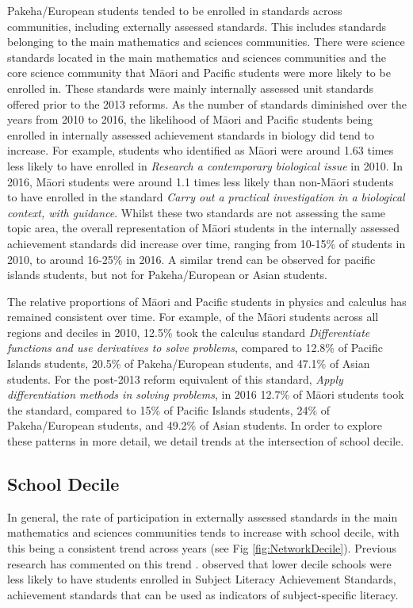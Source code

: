 \documentclass[a4paper]{article}
\begin{document}
\begin{figure}
    \label{fig:NetworkEthnicity}
\end{figure}

Pakeha/European students tended to be enrolled in standards across communities, including externally assessed standards. This includes standards belonging to the main mathematics and sciences communities. There were science standards located in the main mathematics and sciences communities and the core science community that M\={a}ori and Pacific students were more likely to be enrolled in. These standards were mainly internally assessed unit standards  offered prior to the 2013 reforms. As the number of standards diminished over the years from 2010 to 2016, the likelihood of M\={a}ori and Pacific students being enrolled in internally assessed achievement standards in biology did tend to increase. For example, students who identified as M\={a}ori were around 1.63 times less likely to have enrolled in \textit{Research a contemporary biological issue} in 2010. In 2016, M\={a}ori students were around 1.1 times less likely than non-M\={a}ori students to have enrolled in the standard \textit{Carry out a practical investigation in a biological context, with guidance}. Whilst these two standards are not assessing the same topic area, the overall representation of M\={a}ori students in the internally assessed achievement standards did increase over time, ranging from 10-15\% of students in 2010, to around 16-25\% in 2016. A similar trend can be observed for pacific islands students, but not for Pakeha/European or Asian students. 

The relative proportions of M\={a}ori and Pacific students in physics and calculus has remained consistent over time. For example, of the M\={a}ori students across all regions and deciles in 2010, 12.5\% took the calculus standard \textit{Differentiate functions and use derivatives to solve problems}, compared to 12.8\% of Pacific Islands students, 20.5\% of Pakeha/European students, and 47.1\% of Asian students. For the post-2013 reform equivalent of this standard, \textit{Apply differentiation methods in solving problems}, in 2016 12.7\% of M\={a}ori students took the standard, compared to 15\% of Pacific Islands students, 24\% of Pakeha/European students, and 49.2\% of Asian students. In order to explore these patterns in more detail, we detail trends at the intersection of school decile. 

\subsection*{School Decile}
In general, the rate of participation in externally assessed standards in the main mathematics and sciences communities tends to increase with school decile, with this being a consistent trend across years (see Fig \ref{fig:NetworkDecile}). Previous research has commented on this trend \citep{hipkins2016ncea}. \cite{wilson2017subject} observed that lower decile schools were less likely to have students enrolled in Subject Literacy Achievement Standards, achievement standards that can be used as indicators of subject-specific literacy.  
\end{document}
